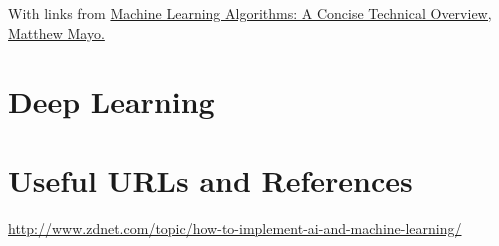 \documentclass[11pt]{article}
\begin{document}
With links from
\href{https://www.linkedin.com/pulse/machine-learning-algorithms-concise-technical-overview-matthew-mayo}{Machine
Learning Algorithms: A Concise Technical Overview, Matthew Mayo.}


\section{Deep Learning}


































\section{Useful URLs and References}
\href{http://www.zdnet.com/topic/how-to-implement-ai-and-machine-learning/}{http://www.zdnet.com/topic/how-to-implement-ai-and-machine-learning/}\\

















\end{document}
